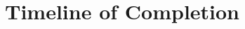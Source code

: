 \documentclass[../AdvancementSummary.tex]{subfiles}
\begin{document}
\section{Timeline of Completion}



\end{document}
